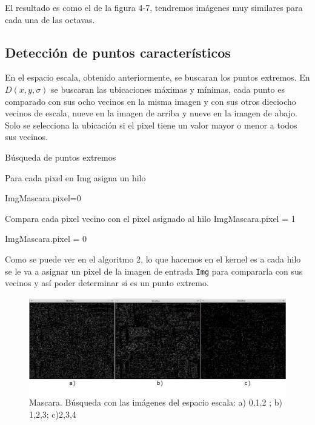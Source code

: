 El resultado es como el de la figura 4-7, tendremos imágenes muy similares para cada una de las octavas. 
\\


\subsection{Detección de puntos característicos}
En el espacio escala, obtenido anteriormente, se buscaran los puntos extremos. En $D(x,y,\sigma)$ se buscaran las ubicaciones máximas y mínimas, cada punto es comparado con sus ocho vecinos en la misma imagen y con sus otros dieciocho vecinos de escala, nueve en la imagen de arriba y nueve en la imagen de abajo. Solo se selecciona la ubicación si el pixel tiene un valor mayor o menor a todos sus vecinos.\\


\begin{algorithm}[H]
\caption{Búsqueda de puntos extremos}
 Para cada pixel en Img asigna un hilo\;
 
 {
	{
		ImgMascara.pixel=0\;
	}{
		{
			Compara cada pixel vecino con el pixel asignado al hilo\;
			{
				ImgMascara.pixel = 1\;			
			}{
				ImgMascara.pixel = 0\;
			
			}
		
		}
		
	}
 }
	
\end{algorithm}


Como se puede ver en el algoritmo 2, lo que hacemos en el kernel es a cada hilo se le va a asignar un pixel de la imagen de entrada \texttt{Img} para compararla con sus vecinos y así poder determinar si es un punto extremo.
 
\begin{figure}[h]
			\centering
				\includegraphics[scale=0.3]{img/minmaxs.jpg}
			\caption{Mascara.  Búsqueda con las imágenes del espacio escala: a) 0,1,2 ; b) 1,2,3; c)2,3,4  }
\end{figure} 
 
